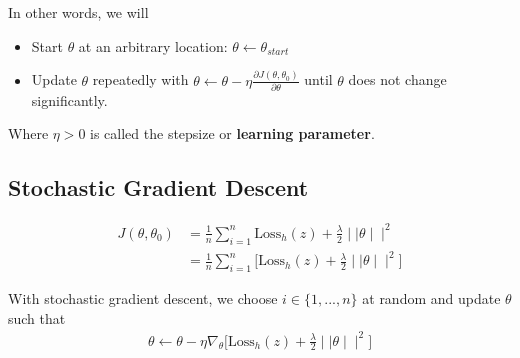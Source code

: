 In other words, we will
\begin{itemize}
\item Start $\theta$ at an arbitrary location: $\theta \leftarrow \theta _{start}$
\item Update $\theta$ repeatedly with $\theta \leftarrow \theta - \eta \frac{\partial J(\theta , \theta _0)}{\partial \theta }$ until $\theta$ does not change significantly.
\end{itemize}

Where $\eta >0$ is called the stepsize or \textbf{learning parameter}.

\subsection{Stochastic Gradient Descent}

\begin{align*}
J(\theta , \theta _0) &= \frac{1}{n} \sum _{i=1}^{n} \text {Loss}_ h (z) + \frac{\lambda }{2} \mid \mid \theta \mid \mid ^2\\
&= \frac{1}{n} \sum _{i=1}^{n}\big [ \text {Loss}_ h (z) + \frac{\lambda }{2} \mid \mid \theta \mid \mid ^2 \big ]
\end{align*}

With stochastic gradient descent, we choose $i \in \big \{ 1,...,n \big \}$ at random and update $\theta$ such that\\

\begin{align*}
\theta \leftarrow \theta - \eta \nabla _{\theta } \big [\text {Loss}_ h(z) + \frac{\lambda }{2}\mid \mid \theta \mid \mid ^2 \big ]
\end{align*}

